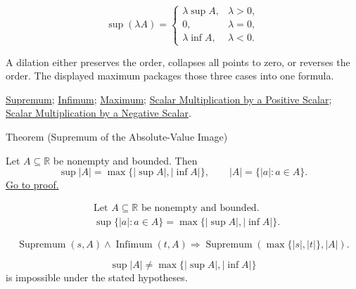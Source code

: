 \begin{remark*}
\[
\sup(\lambda A)=
\begin{cases}
\lambda\sup A, & \lambda>0,\\
0, & \lambda=0,\\
\lambda\inf A, & \lambda<0.
\end{cases}
\]
\end{remark*}

\begin{remark*}[Interpretation]
A dilation either preserves the order, collapses all points to zero, or reverses the order. The displayed maximum packages those three cases into one formula.
\end{remark*}

\begin{remark*}[Dependencies]
\hyperref[def:supremum]{Supremum};
\hyperref[def:infimum]{Infimum};
\hyperref[def:maximum]{Maximum};
\hyperref[thm:scalar-mult-positive]{Scalar Multiplication by a Positive Scalar};
\hyperref[thm:scalar-mult-negative]{Scalar Multiplication by a Negative Scalar}.
\end{remark*}


\begin{theorembox}{Theorem (Supremum of the Absolute-Value Image)}
\begin{theorem}
\label{thm:supremum-absolute-value-image}
Let $A\subseteq\mathbb{R}$ be nonempty and bounded. Then
\[
  \sup |A|=\max\{|\sup A|,|\inf A|\},
  \qquad
  |A|=\{|a|:a\in A\}.
\]
\hyperref[prf:supremum-absolute-value-image]{Go to proof.}
\end{theorem}
\end{theorembox}

\begin{remark*}
\[
\begin{aligned}
&\text{Let }A\subseteq\mathbb{R}\text{ be nonempty and bounded.}\\
&\sup\{|a|:a\in A\}=\max\{|\sup A|,|\inf A|\}.
\end{aligned}
\]
\end{remark*}

\begin{remark*}
\[
\operatorname{Supremum}(s,A)\land \operatorname{Infimum}(t,A)
\Longrightarrow
\operatorname{Supremum}(\max\{|s|,|t|\},|A|).
\]
\end{remark*}

\begin{remark*}
\[
\sup |A|\ne \max\{|\sup A|,|\inf A|\}
\]
is impossible under the stated hypotheses.
\end{remark*}

